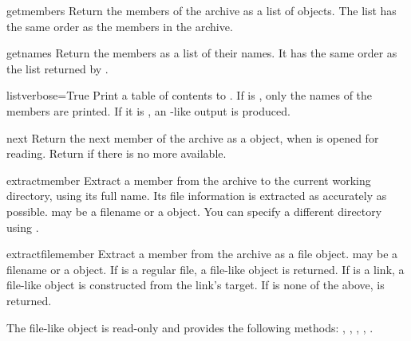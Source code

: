\begin{methoddesc}{getmembers}{}
    Return the members of the archive as a list of  objects.
    The list has the same order as the members in the archive.
\end{methoddesc}

\begin{methoddesc}{getnames}{}
    Return the members as a list of their names. It has the same order as
    the list returned by .
\end{methoddesc}

\begin{methoddesc}{list}{verbose=True}
    Print a table of contents to . If  is
    , only the names of the members are printed. If it is
    , an -like output is produced.
\end{methoddesc}

\begin{methoddesc}{next}{}
    Return the next member of the archive as a  object, when
     is opened for reading. Return  if there is no
    more available.
\end{methoddesc}

\begin{methoddesc}{extract}{member}
    Extract a member from the archive to the current working directory,
    using its full name. Its file information is extracted as accurately as
    possible.
     may be a filename or a  object.
    You can specify a different directory using .
\end{methoddesc}

\begin{methoddesc}{extractfile}{member}
    Extract a member from the archive as a file object.
     may be a filename or a  object.
    If  is a regular file, a file-like object is returned.
    If  is a link, a file-like object is constructed from the
    link's target.
    If  is none of the above,  is returned.
    \begin{notice}
        The file-like object is read-only and provides the following methods:
        , , ,
        , .
    \end{notice}
\end{methoddesc}

